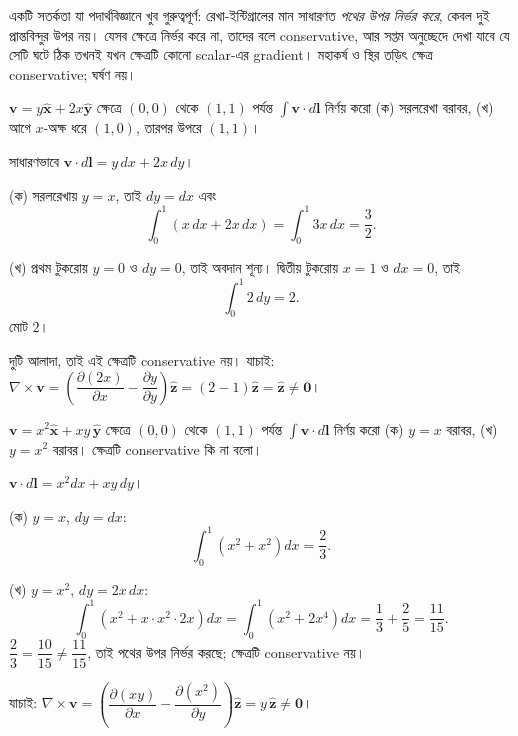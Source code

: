 \documentclass[11pt]{article}
\begin{document}
\begin{remark}
একটি সতর্কতা যা পদার্থবিজ্ঞানে খুব গুরুত্বপূর্ণ: রেখা-ইন্টিগ্রালের মান
সাধারণত \emph{পথের উপর নির্ভর করে}, কেবল দুই প্রান্তবিন্দুর উপর নয়। যেসব
ক্ষেত্রে নির্ভর করে না, তাদের বলে conservative, আর সপ্তম অনুচ্ছেদে দেখা যাবে
যে সেটি ঘটে ঠিক তখনই যখন ক্ষেত্রটি কোনো scalar-এর gradient। মহাকর্ষ ও
স্থির তড়িৎ ক্ষেত্র conservative; ঘর্ষণ নয়।
\end{remark}

\begin{example}
$\mathbf{v} = y\hat{\mathbf{x}} + 2x\hat{\mathbf{y}}$ ক্ষেত্রে $(0,0)$ থেকে
$(1,1)$ পর্যন্ত $\int\mathbf{v}\cdot d\mathbf{l}$ নির্ণয় করো
(ক) সরলরেখা বরাবর, (খ) আগে $x$-অক্ষ ধরে $(1,0)$, তারপর উপরে $(1,1)$।
\end{example}

\begin{solbox}
সাধারণভাবে $\mathbf{v}\cdot d\mathbf{l} = y\,dx + 2x\,dy$।

(ক) সরলরেখায় $y = x$, তাই $dy = dx$ এবং
\[
  \int_{0}^{1}\left( x\,dx + 2x\,dx \right) = \int_{0}^{1}3x\,dx
  = \frac{3}{2} .
\]

(খ) প্রথম টুকরোয় $y = 0$ ও $dy = 0$, তাই অবদান শূন্য। দ্বিতীয় টুকরোয়
$x = 1$ ও $dx = 0$, তাই
\[
  \int_{0}^{1}2\,dy = 2 .
\]
মোট $2$।

দুটি আলাদা, তাই এই ক্ষেত্রটি conservative নয়। যাচাই:
$\nabla\times\mathbf{v} = \left( \dfrac{\partial(2x)}{\partial x}
- \dfrac{\partial y}{\partial y} \right)\hat{\mathbf{z}}
= (2-1)\hat{\mathbf{z}} = \hat{\mathbf{z}} \neq \mathbf{0}$।
\end{solbox}

 $\mathbf{v} = x^{2}\hat{\mathbf{x}} + xy\,\hat{\mathbf{y}}$
ক্ষেত্রে $(0,0)$ থেকে $(1,1)$ পর্যন্ত $\int\mathbf{v}\cdot d\mathbf{l}$
নির্ণয় করো (ক) $y = x$ বরাবর, (খ) $y = x^{2}$ বরাবর। ক্ষেত্রটি
conservative কি না বলো।

\begin{sol}
$\mathbf{v}\cdot d\mathbf{l} = x^{2}dx + xy\,dy$।

(ক) $y = x$, $dy = dx$:
\[
  \int_{0}^{1}\left( x^{2} + x^{2} \right)dx = \frac{2}{3} .
\]

(খ) $y = x^{2}$, $dy = 2x\,dx$:
\[
  \int_{0}^{1}\left( x^{2} + x\cdot x^{2}\cdot 2x \right)dx
  = \int_{0}^{1}\left( x^{2} + 2x^{4} \right)dx
  = \frac{1}{3} + \frac{2}{5} = \frac{11}{15} .
\]
$\dfrac{2}{3} = \dfrac{10}{15} \neq \dfrac{11}{15}$, তাই পথের উপর নির্ভর
করছে; ক্ষেত্রটি conservative নয়।

যাচাই: $\nabla\times\mathbf{v} = \left( \dfrac{\partial(xy)}{\partial x}
- \dfrac{\partial(x^{2})}{\partial y} \right)\hat{\mathbf{z}}
= y\,\hat{\mathbf{z}} \neq \mathbf{0}$।
\end{sol}
\end{document}
